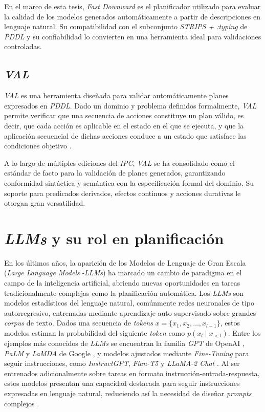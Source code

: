 En el marco de esta tesis, \textit{Fast Downward} es el planificador utilizado para evaluar la calidad de los modelos generados automáticamente a partir de descripciones en lenguaje natural. Su compatibilidad con el subconjunto \textit{STRIPS + :typing} de \textit{PDDL} y su confiabilidad lo convierten en una herramienta ideal para validaciones controladas.

\subsection{\textit{VAL}}

\textit{VAL} es una herramienta diseñada para validar automáticamente planes expresados en \textit{PDDL}. Dado un dominio y problema definidos formalmente, \textit{VAL} permite verificar que una secuencia de acciones constituye un plan válido, es decir, que cada acción es aplicable en el estado en el que se ejecuta, y que la aplicación secuencial de dichas acciones conduce a un estado que satisface las condiciones objetivo \parencite{howey2004val}.

A lo largo de múltiples ediciones del \textit{IPC}, \textit{VAL} se ha consolidado como el estándar de facto para la validación de planes generados, garantizando conformidad sintáctica y semántica con la especificación formal del dominio. Su soporte para predicados derivados, efectos continuos y acciones durativas le otorgan gran versatilidad.

\section{\textit{LLMs} y su rol en planificación}

En los últimos años, la aparición de los Modelos de Lenguaje de Gran Escala (\textit{Large Language Models} -\textit{LLMs}) ha marcado un cambio de paradigma en el campo de la inteligencia artificial, abriendo nuevas oportunidades en tareas tradicionalmente complejas como la planificación automática. Los \textit{LLMs} son modelos estadísticos del lenguaje natural, comúnmente redes neuronales de tipo autorregresivo, entrenadas mediante aprendizaje auto-supervisado sobre grandes \textit{corpus} de texto. Dados una secuencia de \textit{tokens} $x = \{x_1, x_2, \ldots, x_{l-1}\}$, estos modelos estiman la probabilidad del siguiente \textit{token} como $p(x_l \mid x_{<l})$. Entre los ejemplos más conocidos de \textit{LLMs} se encuentran la familia \textit{GPT} de OpenAI \parencite{brown2020language}, \textit{PaLM} y \textit{LaMDA} de Google \parencite{chowdhery2023palm, thoppilan2022lamda}, y modelos ajustados mediante \textit{Fine-Tuning} para seguir instrucciones, como \textit{InstructGPT}, \textit{Flan-T5} y \textit{LLaMA-2 Chat} \parencite{wei2021finetuned, taori2023stanford}. Al ser entrenados adicionalmente sobre tareas en formato instrucción-entrada-respuesta, estos modelos presentan una capacidad destacada para seguir instrucciones expresadas en lenguaje natural, reduciendo así la necesidad de diseñar \textit{prompts} complejos \parencite{wei2021finetuned, chung2024scaling}.

